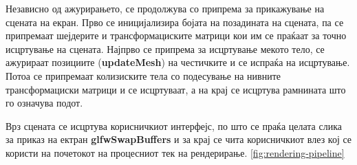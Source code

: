 Независно од ажурирањето, се продолжува со припрема за прикажување на сцената на екран. Прво се иницијализира бојата на позадината на сцената, па се припремаат шејдерите и трансформациските матрици кои им се праќаат за точно исцртување на сцената. Најпрво се припрема за исцртување мекото тело, се ажурираат позициите (\textbf{updateMesh}) на честичките и се испраќа на исцртување.  Потоа се припремаат колизиските тела со подесување на нивните трансформациски матрици и се исцртуваат, а на крај се исцртува рамнината што го означува подот.

Врз сцената се исцртува корисничкиот интерфејс, по што се праќа целата слика за приказ на ектран \textbf{glfwSwapBuffers} и за крај се чита корисничкиот влез кој се користи на почетокот на процесниот тек на рендерирање. \ref{fig:rendering-pipeline}

